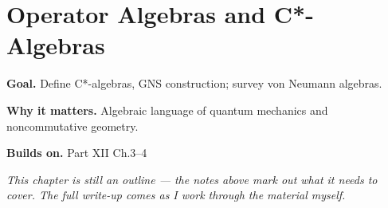 \chapter{Operator Algebras and C*-Algebras}
\label{ch:12-functional-analysis-and-spectral-theory-06}

\begin{chapterintro}
\textbf{Goal.} Define C*-algebras, GNS construction; survey von Neumann algebras.

\textbf{Why it matters.} Algebraic language of quantum mechanics and noncommutative geometry.

\textbf{Builds on.} Part XII Ch.3–4
\end{chapterintro}

\textit{This chapter is still an outline --- the notes above mark out what it needs to cover. The full write-up comes as I work through the material myself.}
